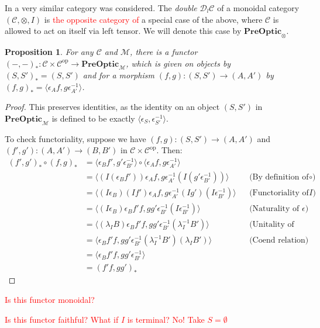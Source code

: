 \documentclass[11pt,a4paper]{article}
\theoremstyle{plain}
\newtheorem{proposition}[theorem]{Proposition}
\theoremstyle{definition}
\newcommand{\C}{\mathscr{C}}
\newcommand{\M}{\mathscr{M}}
\newcommand{\Double}{\mathcal{D}}
\newcommand{\PreOptic}{\mathbf{PreOptic}}
\newcommand{\op}{\mathrm{op}}
\newcommand{\todo}[1]{\textcolor{red}{\small #1}}
\begin{document}
In \cite[Section 6]{Doubles} a very similar category was considered. The \emph{double} $\Double_l \C$ of a monoidal category $(\C, \otimes, I)$ is \todo{the opposite category of} a special case of the above, where $\C$ is allowed to act on itself via left tensor. We will denote this case by $\PreOptic_\otimes$.

\begin{proposition}
For any $\C$ and $\M$, there is a functor $(-, -)_* : \C \times \C^\op \to \PreOptic_\M$, which is given on objects by $(S, S')_* = (S, S')$ and for a morphism $(f, g) : (S, S') \to (A, A')$ by $(f, g)_* = \langle \epsilon_A f, g \epsilon_{A'}^{-1} \rangle$.
\end{proposition}
\begin{proof}
This preserves identities, as the identity on an object $(S, S')$ in $\PreOptic_\M$ is defined to be exactly $\langle \epsilon_S, \epsilon_{S'}^{-1} \rangle$.

To check functoriality, suppose we have $(f, g) : (S, S') \to (A, A')$ and $(f', g') : (A, A') \to (B, B')$ in $\C \times \C^\op$. Then:
\begin{align*}
(f', g')_* \circ (f, g)_* 
&= \langle \epsilon_B f', g' \epsilon_{B'}^{-1} \rangle \circ \langle \epsilon_A f, g \epsilon_{A'}^{-1} \rangle \\
&= \langle (I(\epsilon_B f'))\epsilon_A f, g \epsilon_{A'}^{-1} (I(g' \epsilon_{B'}^{-1}))\rangle && \text{(By definition of $\circ$)}\\
&= \langle (I\epsilon_B) (I f')\epsilon_A f, g \epsilon_{A'}^{-1} (I g')(I\epsilon_{B'}^{-1})\rangle && \text{(Functoriality of action of $I$)}\\
&= \langle (I\epsilon_B) \epsilon_B f' f, g g' \epsilon_{B'}^{-1} (I\epsilon_{B'}^{-1})\rangle && \text{(Naturality of $\epsilon$)}\\
&= \langle (\lambda_I B) \epsilon_B f' f, g g' \epsilon_{B'}^{-1} (\lambda_I^{-1}B')\rangle && \text{(Unitality of action)} \\
&= \langle \epsilon_B f' f, g g' \epsilon_{B'}^{-1} (\lambda_I^{-1}B') (\lambda_I B') \rangle && \text{(Coend relation)}  \\
&= \langle \epsilon_B f'f, g g' \epsilon_{B'}^{-1} \rangle \\
&= (f'f, gg')_*
\end{align*}
\end{proof}
\todo{Is this functor monoidal?}

\todo{Is this functor faithful? What if $I$ is terminal? No! Take $S = \emptyset$}
\end{document}

